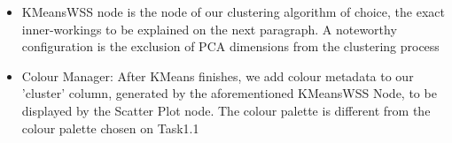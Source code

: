 \documentclass[11pt]{article}
\begin{document}

			\begin{itemize}
				\item KMeansWSS node is the node of our clustering algorithm of choice, the exact inner-workings to be explained on the next paragraph. A noteworthy configuration is the exclusion of PCA dimensions from the clustering process
				\item Colour Manager: After KMeans finishes, we add colour metadata to our 'cluster' column, generated by the aforementioned KMeansWSS Node, to be displayed by the Scatter Plot node. The colour palette is different from the colour palette chosen on Task1.1
			\end{itemize}
\end{document}
